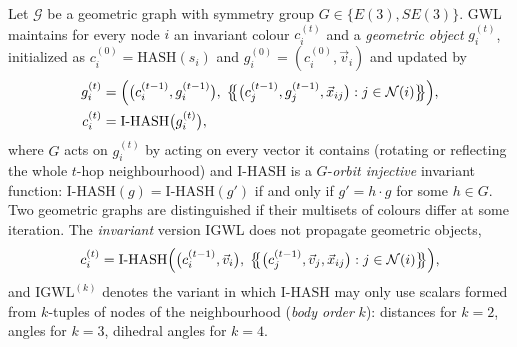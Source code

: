\begin{definition}\label{def:gwl}
	Let $\mathcal{G}$ be a geometric graph with symmetry group $G \in \{E(3), SE(3)\}$. GWL maintains for every node $i$ an invariant colour $c_i^{(t)}$ and a \textit{geometric object} $g_i^{(t)}$, initialized as $c_i^{(0)} = \mathrm{HASH}(s_i)$ and $g_i^{(0)} = (c_i^{(0)}, \vec{v}_i)$ and updated by
	\begin{align}
		g_i^{(t)} &= \Bigl( \bigl(c_i^{(t-1)}, g_i^{(t-1)}\bigr),\; \bigl\{\!\!\bigl\{ \bigl(c_j^{(t-1)}, g_j^{(t-1)}, \vec{x}_{ij}\bigr) : j \in \mathcal{N}(i) \bigr\}\!\!\bigr\} \Bigr), \label{eq:gwl_geometrico}\\
		c_i^{(t)} &= \mathrm{I\text{-}HASH}\bigl(g_i^{(t)}\bigr), \label{eq:gwl_color}
	\end{align}
	where $G$ acts on $g_i^{(t)}$ by acting on every vector it contains (rotating or reflecting the whole $t$-hop neighbourhood) and $\mathrm{I\text{-}HASH}$ is a $G$-\textit{orbit injective} invariant function: $\mathrm{I\text{-}HASH}(g) = \mathrm{I\text{-}HASH}(g')$ if and only if $g' = h \cdot g$ for some $h \in G$. Two geometric graphs are distinguished if their multisets of colours differ at some iteration. The \textit{invariant} version IGWL does not propagate geometric objects,
	\begin{equation}\label{eq:igwl}
		c_i^{(t)} = \mathrm{I\text{-}HASH}\Bigl( \bigl(c_i^{(t-1)}, \vec{v}_i\bigr),\; \bigl\{\!\!\bigl\{ \bigl(c_j^{(t-1)}, \vec{v}_j, \vec{x}_{ij}\bigr) : j \in \mathcal{N}(i) \bigr\}\!\!\bigr\} \Bigr),
	\end{equation}
	and $\mathrm{IGWL}^{(k)}$ denotes the variant in which $\mathrm{I\text{-}HASH}$ may only use scalars formed from $k$-tuples of nodes of the neighbourhood (\textit{body order} $k$): distances for $k = 2$, angles for $k = 3$, dihedral angles for $k = 4$.
\end{definition}

